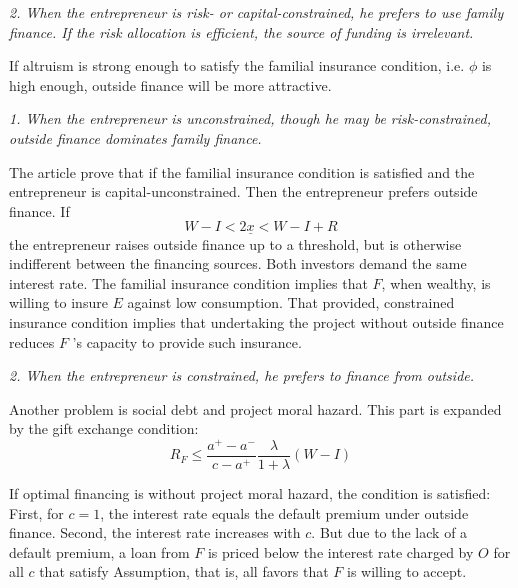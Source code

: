 \documentclass{article}
\begin{document}
    \emph{2. When the entrepreneur is risk- or capital-constrained, he prefers to use family finance. If the risk allocation is efficient, the source of funding is irrelevant.}


    If altruism is strong enough to satisfy the familial insurance condition, i.e. $\phi$ is high enough, outside finance will be more attractive. 

    \emph{1. When the entrepreneur is unconstrained, though he may be risk-constrained, outside finance dominates family finance. }
    
    The article prove that if the familial insurance condition is satisfied and the entrepreneur is capital-unconstrained. Then the entrepreneur prefers outside finance.
    If 
    \begin{equation}
        W-I<2\underline{x}<W-I+R
    \end{equation}
    the entrepreneur raises outside finance up to a threshold, but is otherwise indifferent between
    the financing sources. Both investors demand the same interest rate. The familial insurance condition 
    implies that $F$, when wealthy, is willing to insure $E$ against low consumption. That provided, constrained insurance condition implies that undertaking the project without outside finance 
    reduces $F$ ’s capacity to provide such insurance.

    \emph{2. When the entrepreneur is constrained, he prefers to finance from outside. }

    Another problem is social debt and project moral hazard. This part is expanded by the gift exchange condition: 
    \begin{equation}
        R_F\leq \frac{a^{+}-a^-}{c-a^+}\frac{\lambda}{1+\lambda}(W-I)
    \end{equation}

    If optimal financing is without project moral hazard, the condition is satisfied:
    First, for $c=1$, the interest rate equals the default premium under outside finance. Second, 
    the interest rate increases with $c$. But due to the lack of a default premium, a loan from $F$ is priced below the interest rate charged by $O$ for all $c$ that satisfy Assumption, that is, all favors that $F$ is willing to accept.
\end{document}
